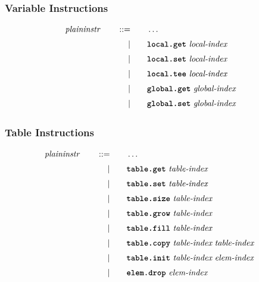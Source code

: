 \subsubsection{Variable Instructions}
\begin{alignat*}{9}
    && \textit{plaininstr}\ &&\quad ::= &\quad && \dots \quad &&  \\[1mm]
    &&       &&\quad | &\quad && \textbf{\texttt{local.get}}\ \textit{local-index}\quad &&  \\[1mm]
    &&       &&\quad | &\quad && \textbf{\texttt{local.set}}\ \textit{local-index}\quad &&  \\[1mm]
    &&       &&\quad | &\quad && \textbf{\texttt{local.tee}}\ \textit{local-index}\quad &&  \\[1mm]
    &&       &&\quad | &\quad && \textbf{\texttt{global.get}}\ \textit{global-index}\quad &&  \\[1mm]
    &&       &&\quad | &\quad && \textbf{\texttt{global.set}}\ \textit{global-index}\quad &&  \\[1mm]
\end{alignat*}

\subsubsection{Table Instructions}
\begin{alignat*}{9}
    && \textit{plaininstr}\ &&\quad ::= &\quad && \dots \quad &&  \\[1mm]
    &&       &&\quad | &\quad && \textbf{\texttt{table.get}}\ \textit{table-index}\ \quad &&  \\[1mm]
    &&       &&\quad | &\quad && \textbf{\texttt{table.set}}\ \textit{table-index}\ \quad &&  \\[1mm]
    &&       &&\quad | &\quad && \textbf{\texttt{table.size}}\ \textit{table-index}\ \quad &&  \\[1mm]
    &&       &&\quad | &\quad && \textbf{\texttt{table.grow}}\ \textit{table-index}\ \quad &&  \\[1mm]
    &&       &&\quad | &\quad && \textbf{\texttt{table.fill}}\ \textit{table-index}\ \quad &&  \\[1mm]
    &&       &&\quad | &\quad && \textbf{\texttt{table.copy}}\ \textit{table-index}\ \textit{table-index}\ \quad &&  \\[1mm]
    &&       &&\quad | &\quad && \textbf{\texttt{table.init}}\ \textit{table-index}\ \textit{elem-index}\ \quad &&  \\[1mm]
    &&       &&\quad | &\quad && \textbf{\texttt{elem.drop}}\ \textit{elem-index}\ \quad &&  \\[1mm]
\end{alignat*}

